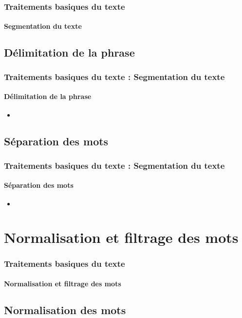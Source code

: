 \documentclass[xcolor=table]{beamer}
\begin{document}
\begin{frame}
\frametitle{Traitements basiques du texte}
\framesubtitle{Segmentation du texte}


\end{frame}

\subsection{Délimitation de la phrase}

\begin{frame}
\frametitle{Traitements basiques du texte : Segmentation du texte}
\framesubtitle{Délimitation de la phrase} 

\begin{itemize}
\item 
\end{itemize}

\end{frame}

\subsection{Séparation des mots}

\begin{frame}
\frametitle{Traitements basiques du texte : Segmentation du texte}
\framesubtitle{Séparation des mots}

\begin{itemize}
\item 
\end{itemize}

\end{frame}

\section{Normalisation et filtrage des mots}

\begin{frame}
\frametitle{Traitements basiques du texte}
\framesubtitle{Normalisation et filtrage des mots}


\end{frame}

\subsection{Normalisation des mots}
\end{document}
